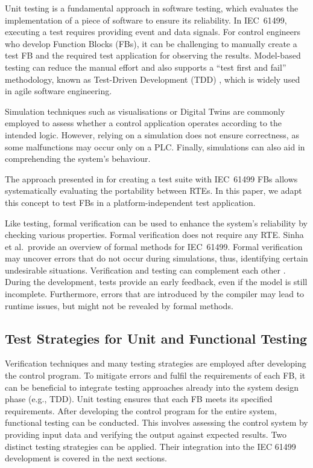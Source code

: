 Unit testing is a fundamental approach in software testing, which evaluates the implementation of a piece of software \cite{softwareTesting} to ensure its reliability. In IEC~61499, executing a test requires providing event and data signals. For control engineers who develop Function Blocks (FBs), it can be challenging to manually create a test FB and the required test application for observing the results. Model-based testing can reduce the manual effort and also supports a ``test first and fail'' methodology, known as Test-Driven Development (TDD) \cite{hametner2014}, which is widely used in agile software engineering.


Simulation techniques such as visualisations or Digital Twins are commonly employed to assess whether a control application operates according to the intended logic. However, relying on a simulation does not ensure correctness, as some malfunctions may occur only on a PLC. Finally, simulations can also aid in comprehending the system's behaviour.

The approach presented in \cite{Testing_Midhun} for creating a test suite with IEC~61499 FBs allows systematically evaluating the portability between RTEs. In this paper, we adapt this concept to test FBs in a platform-independent test application. 

Like testing, formal verification can be used to enhance the system's reliability by checking various properties. Formal verification does not require any RTE. Sinha et al.\,\cite{Sinha.2019} provide an overview of formal methods for IEC~61499. Formal verification may uncover errors that do not occur during simulations, thus, identifying certain undesirable situations. 
Verification and testing can complement each other \cite{Hussain.2006}. During the development, tests provide an early feedback, even if the model is still incomplete. Furthermore, errors that are introduced by the compiler may lead to runtime issues, but might not be revealed by formal methods. 

\subsection{Test Strategies for Unit and Functional Testing}
Verification techniques and many testing strategies are employed after developing the control program. To mitigate errors and fulfil the requirements of each FB, it can be beneficial to integrate testing approaches already into the system design phase (e.g., TDD). Unit testing ensures that each FB meets its specified requirements. After developing the control program for the entire system, functional testing can be conducted. This involves assessing the control system by providing input data and verifying the output against expected results.
Two distinct testing strategies can be applied. Their integration into the IEC 61499 development is covered in the next sections. 

